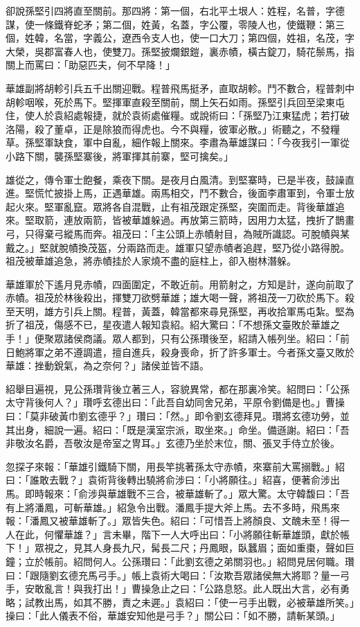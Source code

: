 卻說孫堅引四將直至關前。那四將：第一個，右北平土垠人：姓程，名普，字德謀，使一條鐵脊蛇矛；第二個，姓黃，名蓋，字公覆，零陵人也，使鐵鞭：第三個，姓韓，名當，字義公，遼西令支人也，使一口大刀；第四個，姓祖，名茂，字大榮，吳郡富春人也，使雙刀。孫堅披爛銀鎧，裏赤幘，橫古錠刀，騎花鬃馬，指關上而罵曰：「助惡匹夫，何不早降！」

華雄副將胡軫引兵五千出關迎戰。程普飛馬挺矛，直取胡軫。鬥不數合，程普刺中胡軫咽喉，死於馬下。堅揮軍直殺至關前，關上矢石如雨。孫堅引兵回至梁東屯住，使人於袁紹處報捷，就於袁術處催糧。或說術曰：「孫堅乃江東猛虎；若打破洛陽，殺了董卓，正是除狼而得虎也。今不與糧，彼軍必散。」術聽之，不發糧草。孫堅軍缺食，軍中自亂，細作報上關來。李肅為華雄謀曰：「今夜我引一軍從小路下關，襲孫堅寨後，將軍揮其前寨，堅可擒矣。」

雄從之，傳令軍士飽餐，乘夜下關。是夜月白風清。到堅寨時，已是半夜，鼓譟直進。堅慌忙披掛上馬，正遇華雄。兩馬相交，鬥不數合，後面李肅軍到，令軍士放起火來。堅軍亂竄。眾將各自混戰，止有祖茂跟定孫堅，突圍而走。背後華雄追來。堅取箭，連放兩箭，皆被華雄躲過。再放第三箭時，因用力太猛，拽折了鵲畫弓，只得棄弓縱馬而奔。祖茂曰：「主公頭上赤幘射目，為賊所識認。可脫幘與某戴之。」堅就脫幘換茂盔，分兩路而走。雄軍只望赤幘者追趕，堅乃從小路得脫。祖茂被華雄追急，將赤幘挂於人家燒不盡的庭柱上，卻入樹林潛躲。

華雄軍於下遙月見赤幘，四面圍定，不敢近前。用箭射之，方知是計，遂向前取了赤幘。祖茂於林後殺出，揮雙刀欲劈華雄；雄大喝一聲，將祖茂一刀砍於馬下。殺至天明，雄方引兵上關。程普，黃蓋，韓當都來尋見孫堅，再收拾軍馬屯紮。堅為折了祖茂，傷感不已，星夜遣人報知袁紹。紹大驚曰：「不想孫文臺敗於華雄之手！」便聚眾諸侯商議。眾人都到，只有公孫瓚後至，紹請入帳列坐。紹曰：「前日鮑將軍之弟不遵調遣，擅自進兵，殺身喪命，折了許多軍士。今者孫文臺又敗於華雄：挫動銳氣，為之奈何？」諸侯並皆不語。

紹舉目遍視，見公孫瓚背後立著三人，容貌異常，都在那裏冷笑。紹問曰：「公孫太守背後何人？」瓚呼玄德出曰：「此吾自幼同舍兄弟，平原令劉備是也。」曹操曰：「莫非破黃巾劉玄德乎？」瓚曰：「然。」即令劉玄德拜見。瓚將玄德功勞，並其出身，細說一遍。紹曰：「既是漢室宗派，取坐來。」命坐。備遜謝。紹曰：「吾非敬汝名爵，吾敬汝是帝室之冑耳。」玄德乃坐於末位，關、張叉手侍立於後。

忽探子來報：「華雄引鐵騎下關，用長竿挑著孫太守赤幘，來寨前大罵搦戰。」紹曰：「誰敢去戰？」袁術背後轉出驍將俞涉曰：「小將願往。」紹喜，便著俞涉出馬。即時報來：「俞涉與華雄戰不三合，被華雄斬了。」眾大驚。太守韓馥曰：「吾有上將潘鳳，可斬華雄。」紹急令出戰。潘鳳手提大斧上馬。去不多時，飛馬來報：「潘鳳又被華雄斬了。」眾皆失色。紹曰：「可惜吾上將顏良、文醜未至！得一人在此，何懼華雄？」言未畢，階下一人大呼出曰：「小將願往斬華雄頭，獻於帳下！」眾視之，見其人身長九尺，髯長二尺；丹鳳眼，臥蠶眉；面如重棗，聲如巨鐘；立於帳前。紹問何人。公孫瓚曰：「此劉玄德之弟關羽也。」紹問見居何職。瓚曰：「跟隨劉玄德充馬弓手。」帳上袁術大喝曰：「汝欺吾眾諸侯無大將耶？量一弓手，安敢亂言！與我打出！」曹操急止之曰：「公路息怒。此人既出大言，必有勇略；試教出馬，如其不勝，責之未遲。」袁紹曰：「使一弓手出戰，必被華雄所笑。」操曰：「此人儀表不俗，華雄安知他是弓手？」關公曰：「如不勝，請斬某頭。」

